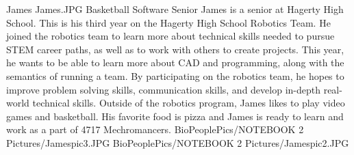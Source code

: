 \insertbio
{James}
{James.JPG}
{Basketball}
{Software}
{Senior}
{
James is a senior at Hagerty High School. This is his third year on the Hagerty High School Robotics Team. He joined the robotics team to learn more about technical skills needed to pursue STEM career paths, as well as to work with others to create projects. This year, he wants to be able to learn more about CAD and programming, along with the semantics of running a team. By participating on the robotics team, he hopes to improve problem solving skills, communication skills, and develop in-depth real-world technical skills. Outside of the robotics program, James likes to play video games and basketball. His favorite food is pizza and James is ready to learn and work as a part of 4717 Mechromancers.
}
{BioPeoplePics/NOTEBOOK 2 Pictures/Jamespic3.JPG}
{BioPeoplePics/NOTEBOOK 2 Pictures/Jamespic2.JPG}
